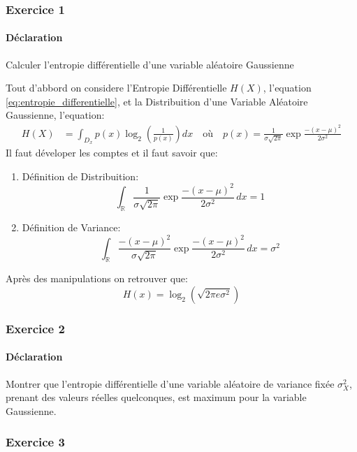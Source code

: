 \documentclass{article}
\begin{document}
\subsubsection{Exercice 1}
\paragraph{Déclaration}Calculer l'entropie différentielle d'une variable aléatoire Gaussienne
\begin{resolution}
Tout d'abbord on considere l'Entropie Différentielle $H(X)$, l'equation \ref{eq:entropie_differentielle}, et la Distribuition d'une Variable Aléatoire Gaussienne, l'equation:
\begin{align*}
    H(X) &= \int_{D_x} p(x) \log_{2} \left( \frac{1}{p(x)} \right) dx
    \quad\text{où}\quad
    p(x) = \frac{1}{\sigma\sqrt{2\pi}} \exp{\frac{-(x - \mu)^2}{2\sigma^2}}
\end{align*}
Il faut déveloper les comptes et il faut savoir que:
\begin{enumerate}
    \item Définition de Distribuition:
    \begin{equation}
        \int_{\mathbb{R}} \frac{1}{\sigma\sqrt{2\pi}} \exp{\frac{-(x - \mu)^2}{2\sigma^2}}\,dx = 1
    \end{equation}
    \item Définition de Variance:
    \begin{equation}
        \int_{\mathbb{R}} \frac{-(x - \mu)^2}{\sigma\sqrt{2\pi}} \exp{\frac{-(x - \mu)^2}{2\sigma^2}}\,dx = \sigma^2
    \end{equation}
\end{enumerate}
Après des manipulations on retrouver que:
\begin{equation}
    \boxed{
        H(x) = \log_{2} (\sqrt{2\pi e \sigma^2})
    }
\end{equation}
\end{resolution}

\subsubsection{Exercice 2}
\paragraph{Déclaration}Montrer que l'entropie différentielle d'une variable aléatoire de variance fixée $\sigma_{X}^{2}$, prenant des valeurs réelles quelconques, est maximum pour la variable Gaussienne.
\begin{resolution}
    
\end{resolution}

\subsubsection{Exercice 3}
\begin{resolution}
    
\end{resolution}
\end{document}
